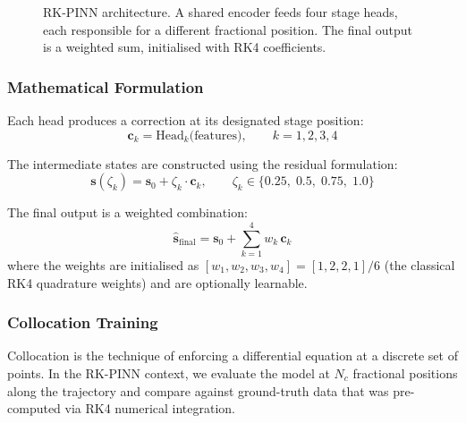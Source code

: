 \documentclass[11pt,a4paper]{article}
\newcommand{\zfrac}{\zeta}
\newcommand{\vstate}{\mathbf{s}}
\newcommand{\vc}{\mathbf{c}}
\begin{document}
\begin{figure}[H]
\caption{RK-PINN architecture.  A shared encoder feeds four stage heads,
  each responsible for a different fractional position.  The final output
  is a weighted sum, initialised with RK4 coefficients.}
\label{fig:rkpinn_arch}
\end{figure}

\subsubsection{Mathematical Formulation}

Each head produces a correction at its designated stage position:
\begin{equation}\label{eq:rkpinn_heads}
  \vc_k = \text{Head}_k\!\bigl(\text{features}\bigr),
  \qquad k = 1,2,3,4
\end{equation}

The intermediate states are constructed using the residual formulation:
\begin{equation}\label{eq:rkpinn_states}
  \vstate(\zfrac_k) = \vstate_0 + \zfrac_k \cdot \vc_k,
  \qquad
  \zfrac_k \in \{0.25,\; 0.5,\; 0.75,\; 1.0\}
\end{equation}

The final output is a weighted combination:
\begin{equation}\label{eq:rkpinn_output}
  \hat{\vstate}_{\mathrm{final}} = \vstate_0
  + \sum_{k=1}^{4} w_k\,\vc_k
\end{equation}
where the weights are initialised as $[w_1,w_2,w_3,w_4]=[1,2,2,1]/6$
(the classical RK4 quadrature weights) and are optionally learnable.

\subsubsection{Collocation Training}\label{sec:collocation}

Collocation is the technique of enforcing a differential equation at a
discrete set of points.  In the RK-PINN context, we evaluate the model at
$N_c$ fractional positions along the trajectory and compare against
ground-truth data that was pre-computed via RK4 numerical integration.
\end{document}

